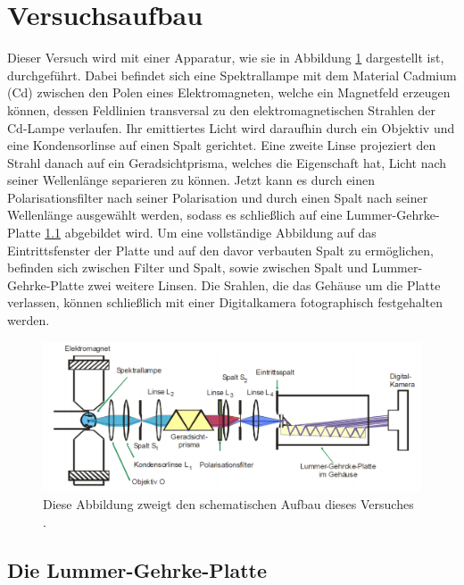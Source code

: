 \section{Versuchsaufbau}
\label{sec:Versuchsaufbau}

Dieser Versuch wird mit einer Apparatur, wie sie in 
Abbildung \ref{abb1} dargestellt ist, durchgeführt.
Dabei befindet sich eine Spektrallampe mit dem Material 
Cadmium (Cd) zwischen den Polen eines Elektromagneten, 
welche ein Magnetfeld erzeugen können, dessen Feldlinien 
transversal zu den elektromagnetischen Strahlen der 
Cd-Lampe verlaufen.
Ihr emittiertes Licht wird daraufhin durch ein Objektiv und 
eine Kondensorlinse auf einen Spalt gerichtet. Eine zweite 
Linse projeziert den Strahl danach auf ein Geradsichtprisma, 
welches die Eigenschaft hat, Licht nach seiner 
Wellenlänge separieren zu können. Jetzt kann es durch einen 
Polarisationsfilter nach seiner Polarisation und durch einen 
Spalt nach seiner Wellenlänge ausgewählt werden, sodass es 
schließlich auf eine Lummer-Gehrke-Platte \ref{LGP} abgebildet 
wird. Um eine vollständige Abbildung auf das Eintrittsfenster
der Platte und auf den davor verbauten Spalt zu ermöglichen, 
befinden sich zwischen Filter und Spalt, sowie zwischen 
Spalt und Lummer-Gehrke-Platte zwei weitere Linsen. 
Die Srahlen, die das Gehäuse um die Platte verlassen,
können schließlich mit einer Digitalkamera fotographisch 
festgehalten werden.

\begin{figure}
    \centering
    \includegraphics[width=\textwidth]{figure/Aufbau.pdf}
    \caption{Diese Abbildung zweigt den schematischen Aufbau dieses Versuches \cite{sample}.}
    \label{abb1}
\end{figure}

\subsection{Die Lummer-Gehrke-Platte}
\label{LGP}

